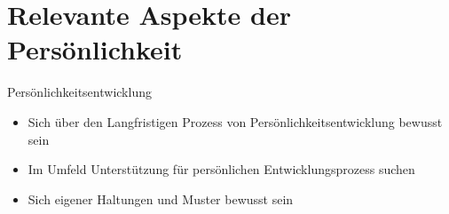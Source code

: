 \section{Relevante Aspekte der Persönlichkeit}

\begin{frame}[c]{Persönlichkeitsentwicklung}
    \begin{itemize}
    \item Sich über den Langfristigen Prozess von Persönlichkeitsentwicklung bewusst sein \newline
    \pause
    \item Im Umfeld Unterstützung für persönlichen Entwicklungsprozess suchen \newline
    \pause
    \item Sich eigener Haltungen und Muster bewusst sein
    \end{itemize}
\end{frame}




